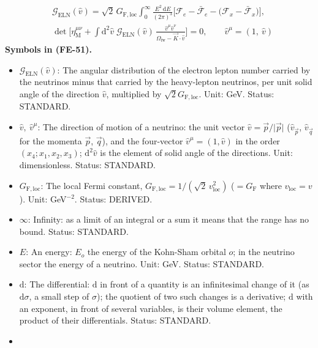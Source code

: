 \documentclass[
  10pt,
]{article}
\providecommand{\tightlist}{%
  \setlength{\itemsep}{0pt}\setlength{\parskip}{0pt}}
\begin{document}
\[
\begin{aligned}
&\mathcal{G}_{\mathrm{ELN}}(\hat v) = \sqrt2\,G_{\mathrm{F,loc}}\int_0^\infty\frac{E^2\,\mathrm{d}E}{(2\pi)^3}\Big[\mathcal{F}_{e} - \bar{\mathcal{F}}_{e}
 - \big(\mathcal{F}_{x} - \bar{\mathcal{F}}_{x}\big)\Big],\\
&\det\Big[\eta_{\mathrm{M}}^{\mu\nu} + \int\mathrm{d}^2\hat v\;\mathcal{G}_{\mathrm{ELN}}(\hat v)\,
 \frac{\hat v^\mu\hat v^\nu}{\Omega_{\mathrm{fw}} - \vec K\cdot\hat v}\Big] = 0,\qquad \hat v^\mu = (1,\ \hat v)
\end{aligned} \tag{FE-51}
\] \textbf{Symbols in (FE-51).}

\begin{itemize}
\tightlist
\item
  \(\mathcal{G}_{\mathrm{ELN}}(\hat v)\): The angular distribution of
  the electron lepton number carried by the neutrinos minus that carried
  by the heavy-lepton neutrinos, per unit solid angle of the direction
  \(\hat v\), multiplied by \(\sqrt2G_{\mathrm{F,loc}}\). Unit: GeV.
  Status: STANDARD.
\item
  \(\hat v,\ \hat v^\mu\): The direction of motion of a neutrino: the
  unit vector \(\hat v = \vec p/\lvert\vec p\rvert\)
  (\(\hat v_{\vec p}\), \(\hat v_{\vec q}\) for the momenta \(\vec p\),
  \(\vec q\)), and the four-vector \(\hat v^\mu = (1, \hat v)\) in the
  order \((x_4; x_1, x_2, x_3)\); \(\mathrm{d}^2\hat v\) is the element
  of solid angle of the directions. Unit: dimensionless. Status:
  STANDARD.
\item
  \(G_{\mathrm{F,loc}}\): The local Fermi constant,
  \(G_{\mathrm{F,loc}} = 1/(\sqrt2\,v_{\mathrm{loc}}^2)\)
  (\(= G_{\mathrm{F}}\) where \(v_{\mathrm{loc}} = v\)). Unit:
  GeV\(^{-2}\). Status: DERIVED.
\item
  \(\infty\): Infinity: as a limit of an integral or a sum it means that
  the range has no bound. Status: STANDARD.
\item
  \(E\): An energy: \(E_o\) the energy of the Kohn-Sham orbital \(o\);
  in the neutrino sector the energy of a neutrino. Unit: GeV. Status:
  STANDARD.
\item
  \(\mathrm{d}\): The differential: \(\mathrm{d}\) in front of a
  quantity is an infinitesimal change of it (as \(\mathrm{d}\sigma\), a
  small step of \(\sigma\)); the quotient of two such changes is a
  derivative; \(\mathrm{d}\) with an exponent, in front of several
  variables, is their volume element, the product of their
  differentials. Status: STANDARD.
\item

\end{itemize}
\end{document}
